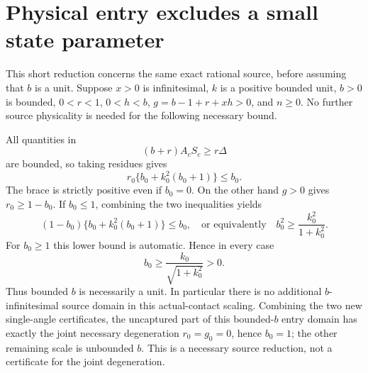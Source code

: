 \section{Physical entry excludes a small state parameter}
\label{sec:c2-bounded-state-entry}

This short reduction concerns the same exact rational source, before
assuming that $b$ is a unit.  Suppose $x>0$ is infinitesimal, $k$ is
a positive bounded unit, $b>0$ is bounded, $0<r<1$, $0<h<b$,
$g=b-1+r+xh>0$, and $n\geq0$.  No further source physicality is
needed for the following necessary bound.

All quantities in
\[
             (b+r)A_cS_c\geq r\Delta
\]
are bounded, so taking residues gives
\[
 r_0\{b_0+k_0^2(b_0+1)\}\leq b_0.
\]
The brace is strictly positive even if $b_0=0$.  On the other hand
$g>0$ gives $r_0\geq1-b_0$.  If $b_0\leq1$, combining the two
inequalities yields
\[
 (1-b_0)\{b_0+k_0^2(b_0+1)\}\leq b_0,
 \quad\text{or equivalently}\quad
              b_0^2\geq\frac{k_0^2}{1+k_0^2}.
\]
For $b_0\geq1$ this lower bound is automatic.  Hence in every case
\[
                b_0\geq\frac{k_0}{\sqrt{1+k_0^2}}>0.
\]
Thus bounded $b$ is necessarily a unit.  In particular there is no
additional $b$-infinitesimal source domain in this actual-contact
scaling.  Combining the two new single-angle certificates, the
uncaptured part of this bounded-$b$ entry domain has exactly the
joint necessary degeneration $r_0=g_0=0$, hence $b_0=1$; the other
remaining scale is unbounded $b$.  This is a necessary source
reduction, not a certificate for the joint degeneration.

